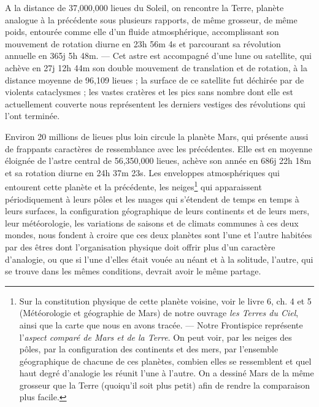 \documentclass[a4paper, 11pt, oneside, landscape]{article}
\begin{document}
A la distance de 37,000,000 lieues du Soleil, on rencontre la Terre, planète analogue à la précédente sous plusieurs rapports, de même grosseur, de même poids, entourée comme elle d'un fluide atmosphérique, accomplissant son mouvement de rotation diurne en 23h 56m 4s et parcourant sa révolution annuelle en 365j 5h 48m. --- Cet astre est accompagné d'une lune ou satellite, qui achève en 27j 12h 44m son double mouvement de translation et de rotation, à la distance moyenne de 96,109 lieues ; la surface de ce satellite fut déchirée par de violents cataclysmes ; les vastes cratères et les pics sans nombre dont elle est actuellement couverte nous représentent les derniers vestiges des révolutions qui l'ont terminée.

Environ 20 millions de lieues plus loin circule la planète Mars, qui présente aussi de frappants caractères de ressemblance avec les précédentes. Elle est en moyenne éloignée de l'astre central de 56,350,000 lieues, achève son année en 686j 22h 18m et sa rotation diurne en 24h 37m 23s. Les enveloppes atmosphériques qui entourent cette planète et la précédente, les neiges\footnote{Sur la constitution physique de cette planète voisine, voir le livre 6, ch. 4 et 5 (Météorologie et géographie de Mars) de notre ouvrage \emph{les Terres du Ciel}, ainsi que la carte que nous en avons tracée. --- Notre Frontispice représente l'\emph{aspect comparé de Mars et de la Terre}. On peut voir, par les neiges des pôles, par la configuration des continents et des mers, par l'ensemble géographique de chacune de ces planètes, combien elles se ressemblent et quel haut degré d'analogie les réunit l'une à l'autre. On a dessiné Mars de la même grosseur que la Terre (quoiqu'il soit plus petit) afin de rendre la comparaison plus facile.} qui apparaissent périodiquement à leurs pôles et les nuages qui s'étendent de temps en temps à leurs surfaces, la configuration géographique de leurs continents et de leurs mers, leur météorologie, les variations de saisons et de climats communes à ces deux mondes, nous fondent à croire que ces deux planètes sont l'une et l'autre habitées par des êtres dont l'organisation physique doit offrir plus d'un caractère d'analogie, ou que si l'une d'elles était vouée au néant et à la solitude, l'autre, qui se trouve dans les mêmes conditions, devrait avoir le même partage.
\end{document}
